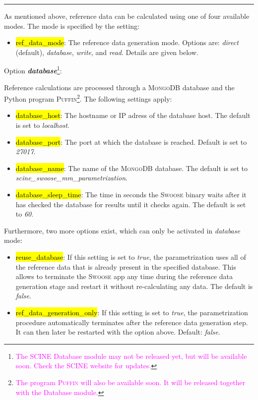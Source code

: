 \documentclass[]{tufte-book}
\begin{document}
\vspace{0.3cm}
\hrule
\vspace{0.3cm}

As mentioned above, reference data can be calculated using one of four available modes. The mode is specified by the setting:

\begin{itemize}
\item \hl{ref\_data\_mode}: The reference data generation mode. Options are: \textit{direct} (default), \textit{database}, \textit{write}, and \textit{read}. Details are given below.
\end{itemize}

Option \textit{\textbf{database}}\footnote{\textcolor{magenta}{The SCINE Database module may not be released yet, but will be available soon. Check the SCINE website for updates.}}:

Reference calculations are processed through a \textsc{MongoDB} database\cite{mongodb} and the Python program \textsc{Puffin}\footnote{\textcolor{magenta}{The program \textsc{Puffin} will also be available soon. It will be released together with the Database module.}}. The following settings apply:

\begin{itemize}
\item \hl{database\_host}: The hostname or IP adress of the database host. The default is set to \textit{localhost}.
\item \hl{database\_port}: The port at which the database is reached. Default is set to \textit{27017}.
\item \hl{database\_name}: The name of the \textsc{MongoDB} database. The default is set to \textit{scine\_swoose\_mm\_parametrization}.
\item \hl{database\_sleep\_time}: The time in seconds the \textsc{Swoose} binary waits after it has checked the database for results until it checks again. The default is set to \textit{60}.
\end{itemize}

Furthermore, two more options exist, which can only be activated in \textit{database} mode:

\begin{itemize}
\item \hl{reuse\_database}: If this setting is set to \textit{true}, the parametrization uses all of the reference data that is already present in the specified database. This allows to terminate the \textsc{Swoose} app any time during the reference data generation stage and restart it without re-calculating any data. The default is \textit{false}.
\item \hl{ref\_data\_generation\_only}: If this setting is set to \textit{true}, the parametrization procedure automatically terminates after the reference data generation step. It can then later be restarted with the option above. Default: \textit{false}.
\end{itemize}
\end{document}
